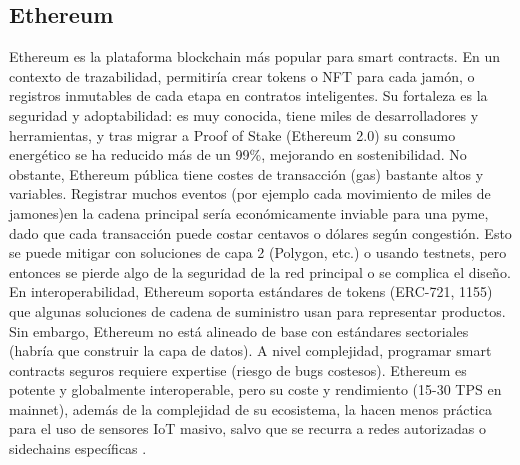 \subsection{Ethereum}\label{sec:estado-ethereum}
Ethereum es la plataforma blockchain más popular para smart contracts. En un contexto de trazabilidad, permitiría crear tokens o NFT para cada jamón, o registros inmutables de cada etapa en contratos inteligentes. Su fortaleza es la seguridad y adoptabilidad: es muy conocida, tiene miles de desarrolladores y herramientas, y tras migrar a Proof of Stake (Ethereum 2.0) su consumo energético se ha reducido más de un 99\%, mejorando en sostenibilidad. No obstante, Ethereum pública tiene costes de transacción (gas) bastante altos y variables. Registrar muchos eventos (por ejemplo cada movimiento de miles de jamones)en la cadena principal sería económicamente inviable para una pyme, dado que cada transacción puede costar centavos o dólares según congestión. Esto se puede mitigar con soluciones de capa 2 (Polygon, etc.) o usando testnets, pero entonces se pierde algo de la seguridad de la red principal o se complica el diseño. En interoperabilidad, Ethereum soporta estándares de tokens (ERC-721, 1155) que algunas soluciones de cadena de suministro usan para representar productos. Sin embargo, Ethereum no está alineado de base con estándares sectoriales (habría que construir la capa de datos). A nivel complejidad, programar smart contracts seguros requiere expertise (riesgo de bugs costesos). Ethereum es potente y globalmente interoperable, pero su coste y rendimiento (15-30 TPS en mainnet), además de la complejidad de su ecosistema, la hacen menos práctica para el uso de sensores IoT masivo, salvo que se recurra a redes autorizadas o sidechains específicas \cite{noauthor_que_nodate}.

